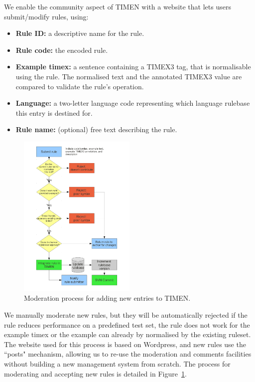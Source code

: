 \documentclass[10pt, a4paper]{article}
\begin{document}
We enable the community aspect of TIMEN with a website that lets users submit/modify rules, using:

\begin{itemize}
\item \textbf{Rule ID:} a descriptive name for the rule.
\item \textbf{Rule code:} the encoded rule. %
\item \textbf{Example timex:} a sentence containing a TIMEX3 tag, that is normalisable using the rule. The normalised text and the annotated TIMEX3 value are compared to validate the rule's operation.
\item \textbf{Language:} a two-letter language code representing which language rulebase this entry is destined for.
\item \textbf{Rule name:} (optional) free text describing the rule.
\end{itemize}

\begin{figure}
\centering
\includegraphics[width=0.5\textwidth,clip]{eps/rule-submission-process.pdf}
\caption{Moderation process for adding new entries to TIMEN.}
\label{fig:moderation}
\end{figure}

We manually moderate new rules, but they will be automatically rejected if the rule reduces performance on a predefined test set, the rule does not work for the example timex or the example can already by normalised by the existing ruleset. The website used for this process is based on Wordpress, and new rules use the ``posts" mechanism, allowing us to re-use the moderation and comments facilities without building a new management system from scratch. The process for moderating and accepting new rules is detailed in Figure~\ref{fig:moderation}.
\end{document}
